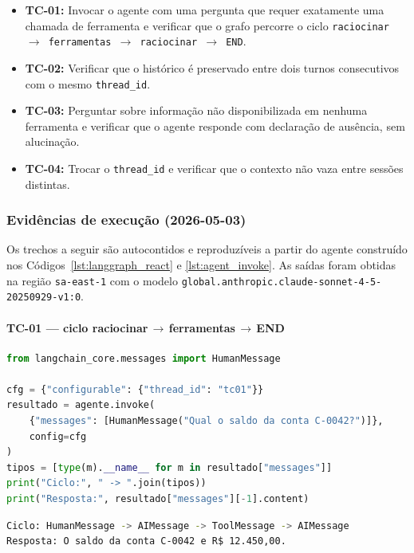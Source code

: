\begin{itemize}[leftmargin=*]
  \item \textbf{TC-01:} Invocar o agente com uma pergunta que requer
        exatamente uma chamada de ferramenta e verificar que o grafo
        percorre o ciclo \texttt{raciocinar $\to$ ferramentas $\to$
        raciocinar $\to$ END}.
  \item \textbf{TC-02:} Verificar que o hist\'orico \'e preservado
        entre dois turnos consecutivos com o mesmo \texttt{thread\_id}.
  \item \textbf{TC-03:} Perguntar sobre informa\c{c}\~ao n\~ao
        disponibilizada em nenhuma ferramenta e verificar que o agente
        responde com declara\c{c}\~ao de aus\^encia, sem alucina\c{c}\~ao.
  \item \textbf{TC-04:} Trocar o \texttt{thread\_id} e verificar que
        o contexto n\~ao vaza entre sess\~oes distintas.
\end{itemize}

\subsubsection*{Evid\^encias de execu\c{c}\~ao (2026-05-03)}

Os trechos a seguir s\~ao autocontidos e reproduz\'iveis a partir do
agente constru\'ido nos C\'odigos~\ref{lst:langgraph_react} e
\ref{lst:agent_invoke}. As sa\'idas foram obtidas na regi\~ao
\texttt{sa-east-1} com o modelo
\nolinkurl{global.anthropic.claude-sonnet-4-5-20250929-v1:0}.

\paragraph{TC-01 --- ciclo raciocinar\,$\to$\,ferramentas\,$\to$\,END}

\begin{lstlisting}[language=Python,
      caption={TC-01 --- verifica\c{c}\~ao do ciclo do grafo ReAct.},
      label={lst:cap3_tc01_codigo}]
from langchain_core.messages import HumanMessage

cfg = {"configurable": {"thread_id": "tc01"}}
resultado = agente.invoke(
    {"messages": [HumanMessage("Qual o saldo da conta C-0042?")]},
    config=cfg
)
tipos = [type(m).__name__ for m in resultado["messages"]]
print("Ciclo:", " -> ".join(tipos))
print("Resposta:", resultado["messages"][-1].content)
\end{lstlisting}

\begin{lstlisting}[language=bash,
      caption={TC-01 --- sa\'ida confirmando o ciclo percorrido.},
      label={lst:cap3_tc01_saida}]
Ciclo: HumanMessage -> AIMessage -> ToolMessage -> AIMessage
Resposta: O saldo da conta C-0042 e R$ 12.450,00.
\end{lstlisting}

